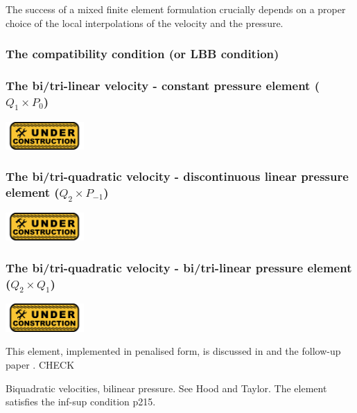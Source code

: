 

The success of a mixed finite element formulation crucially depends on a proper choice of the local interpolations of the velocity and the pressure. 

\subsubsection{The compatibility condition (or LBB condition)}






\subsubsection{The bi/tri-linear velocity - constant pressure element ($Q_1\times P_0$)}
\includegraphics[width=3cm]{images/under_construction}

\subsubsection{The bi/tri-quadratic velocity - discontinuous linear pressure element ($Q_2 \times P_{-1}$)}
\includegraphics[width=3cm]{images/under_construction}

\subsubsection{The bi/tri-quadratic velocity - bi/tri-linear pressure element ($Q_2 \times Q_1$)}
\includegraphics[width=3cm]{images/under_construction}


This element, implemented in penalised form, is discussed in \cite{been79} and the follow-up paper \cite{been80}. CHECK

Biquadratic velocities, bilinear pressure. See Hood and Taylor. The element satisfies the inf-sup condition \cite{hugh}p215. 

